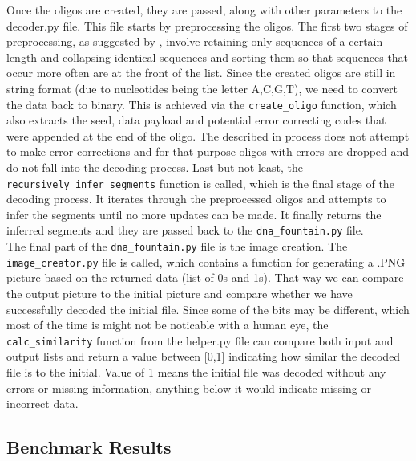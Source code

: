 \documentclass[12pt]%
{article}
\begin{document}
Once the oligos are created, they are passed, along with other parameters to the decoder.py file. This file starts by preprocessing the oligos. The first two stages of preprocessing, as suggested by \cite{erlich2017dnasupplementary}, involve retaining only sequences of a certain length and collapsing identical sequences and sorting them so that sequences that occur more often are at the front of the list. Since the created oligos are still in string format (due to nucleotides being the letter A,C,G,T), we need to convert the data back to binary. This is achieved via the \texttt{create\_oligo} function, which also extracts the seed, data payload and potential error correcting codes that were appended at the end of the oligo. The described in \cite{erlich2017dna} process does not attempt to make error corrections and for that purpose oligos with errors are dropped and do not fall into the decoding process. Last but not least, the \texttt{recursively\_infer\_segments} function is called, which is the final stage of the decoding process. It iterates through the preprocessed oligos and attempts to infer the segments until no more updates can be made. It finally returns the inferred segments and they are passed back to the \texttt{dna\_fountain.py} file. \\
The final part of the \texttt{dna\_fountain.py} file is the image creation. The \texttt{image\_creator.py} file is called, which contains a function for generating a .PNG picture based on the returned data (list of 0s and 1s). That way we can compare the output picture to the initial picture and compare whether we have successfully decoded the initial file. Since some of the bits may be different, which most of the time is might not be noticable with a human eye, the \texttt{calc\_similarity} function from the helper.py file can compare both input and output lists and return a value between [0,1] indicating how similar the decoded file is to the initial. Value of 1 means the initial file was decoded without any errors or missing information, anything below it would indicate missing or incorrect data.


\subsection{Benchmark Results}
\end{document}
